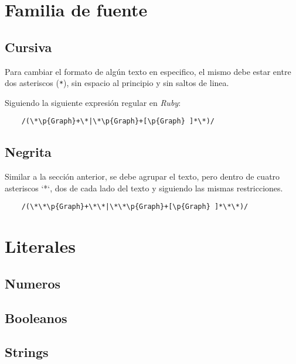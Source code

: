 \documentclass[12pt,letterpaper,titlepage,oneside,openright]{book}
\newcommand{\ruby}{\textit{Ruby}\xspace}
\newcommand{\ttcode}[1]{(\texttt{#1})}
\begin{document}
\section{Familia de fuente}

\subsection{Cursiva}

Para cambiar el formato de algún texto en especifico, el mismo debe estar entre
dos asteriscos \ttcode{*}, sin espacio al principio y sin saltos de linea.

Siguiendo la siguiente expresión regular en \ruby:

\begin{center}
\begin{verbatim}
    /(\*\p{Graph}+\*|\*\p{Graph}+[\p{Graph} ]*\*)/
\end{verbatim}
\end{center}

\subsection{Negrita}

Similar a la sección anterior, se debe agrupar el texto, pero dentro de cuatro
asteriscos `*`, dos de cada lado del texto y siguiendo las mismas restricciones.

\begin{center}
\begin{verbatim}
    /(\*\*\p{Graph}+\*\*|\*\*\p{Graph}+[\p{Graph} ]*\*\*)/
\end{verbatim}
\end{center}

\section{Literales}

\subsection{Numeros}

\subsection{Booleanos}

\subsection{Strings}
\end{document}
